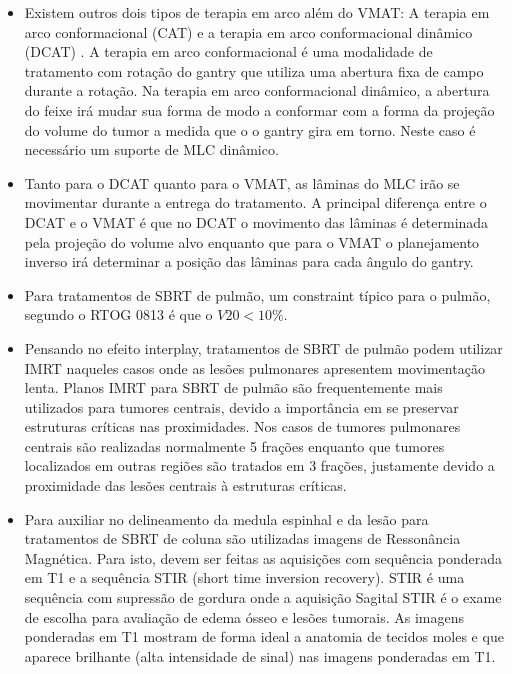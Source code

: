 \documentclass[11pt,a4paper]{article}
\newcounter{exemplo}
\begin{document}
\begin{exemplo}
\begin{itemize}
        \item Existem outros dois tipos de terapia em arco além do VMAT: A terapia em arco conformacional (CAT) e a terapia em arco conformacional dinâmico (DCAT) . A terapia em arco conformacional é uma modalidade de tratamento com rotação do gantry que utiliza uma abertura fixa de campo durante a rotação. Na terapia em arco conformacional dinâmico, a abertura do feixe irá mudar sua forma de modo a conformar com a forma da projeção do volume do tumor a medida que o o gantry gira em torno. Neste caso é necessário um suporte de MLC dinâmico. 

        \item Tanto para o DCAT quanto para o VMAT, as lâminas do MLC irão se movimentar durante a entrega do tratamento. A principal diferença entre o DCAT e o VMAT é que no DCAT o movimento das lâminas é determinada pela projeção do volume alvo enquanto que para o VMAT o planejamento inverso irá determinar a posição das lâminas para cada ângulo do gantry.
        
        \item Para tratamentos de SBRT de pulmão, um constraint típico para o pulmão, segundo o RTOG 0813 é que o $V20 < 10\%$.
        
        \item Pensando no efeito interplay, tratamentos de SBRT de pulmão podem utilizar IMRT naqueles casos onde as lesões pulmonares apresentem movimentação lenta. Planos IMRT para SBRT de pulmão são frequentemente mais utilizados para tumores centrais, devido a importância em se preservar estruturas críticas nas proximidades. Nos casos de tumores pulmonares centrais são realizadas normalmente 5 frações enquanto que tumores localizados em outras regiões são tratados em 3 frações, justamente devido a proximidade das lesões centrais à estruturas críticas.
        
        \item Para auxiliar no delineamento da medula espinhal e da lesão para tratamentos de SBRT de coluna são utilizadas imagens de Ressonância Magnética. Para isto, devem ser feitas as aquisições com sequência ponderada em T1 e a sequência STIR  (short time inversion recovery). STIR é uma sequência com supressão de gordura onde a aquisição Sagital STIR é o exame de escolha para avaliação de edema ósseo e lesões tumorais. As imagens ponderadas em T1 mostram de forma ideal a anatomia de tecidos moles e que aparece brilhante (alta intensidade de sinal) nas imagens ponderadas em T1.


\end{itemize}
\end{exemplo}
\end{document}

